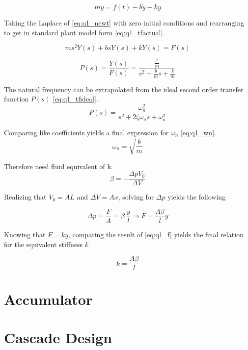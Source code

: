 \begin{equation}
	\label{eq:q1_newt}
	m \ddot{y} = f(t) - b\dot{y} - k y
\end{equation}

Taking the Laplace of \ref{eq:q1_newt} with zero initial conditions and rearranging to get in standard plant model form \ref{eq:q1_tfactual}.

\begin{equation*}
	ms^2 Y(s) + b s Y(s) + k Y(s) = F(s)
\end{equation*}

\begin{equation}
	\label{eq:q1_tfactual}
	P(s) = \frac{Y(s)}{F(s)} = \frac{\frac{1}{m}}{s^2 + \frac{b}{m}s + \frac{k}{m}}
\end{equation}

The natural frequency can be extrapolated from the ideal second order transfer function $P(s)$ \ref{eq:q1_tfideal}.
\begin{equation}
	\label{eq:q1_tfideal}
	P(s)= \frac{\omega_n^2}{s^2+2\zeta\omega_n s + \omega_n^2}
\end{equation}

Comparing like coefficients yields a final expression for $\omega_n$ \ref{eq:q1_wn}.
\begin{equation}
	\label{eq:q1_wn}	
	\omega_n = \sqrt{\frac{k}{m}}	
\end{equation}

Therefore need fluid equivalent of k.
\begin{equation}
	\label{eq:q1_beta}
	\beta = - \frac{\Delta p V_0}{\Delta V}	
\end{equation}

Realizing that $V_0 = AL$ and $\Delta V = Ax$, solving for $\Delta p$ yields the following

\begin{equation}
	\label{eq:q1_f}
	\Delta p = \frac{F}{A}= \beta \ \frac{y}{l} \Rightarrow F = \frac{A\beta}{l}y 	
\end{equation}

Knowing that $F = ky$, comparing the result of \ref{eq:q1_f} yields the final relation for the equivalent stiffness $k$

\begin{equation}
	\label{eq:q1_k}
	 k = \frac{A\beta}{l} 	
\end{equation}
 

\chapter{Accumulator}
\label{chap:q2}


\chapter{Cascade Design}
\label{chap:q3}
